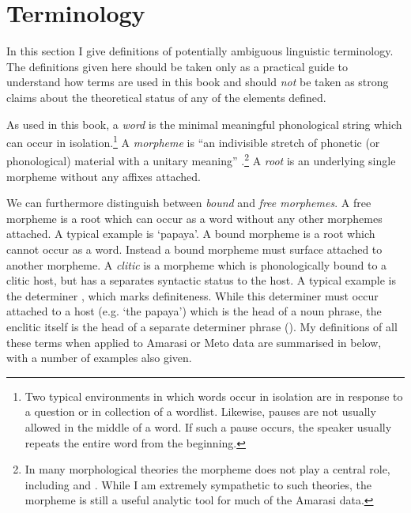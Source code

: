 \section{Terminology}\label{sec:Ter}
In this section I give definitions of potentially ambiguous linguistic terminology.
The definitions given here should be taken only as a practical guide
to understand how terms are used in this book
and should \emph{not} be taken as strong claims
about the theoretical status of any of the elements defined.

As used in this book, a \emph{word} is the minimal meaningful
phonological string which can occur in isolation.\footnote{
		Two typical environments in which words occur in isolation are
		in response to a question or in collection of a wordlist.
		Likewise, pauses are not usually allowed in the middle of a word.
		If such a pause occurs, the speaker usually repeats the entire word from the beginning.}
A \emph{morpheme} is ``an indivisible stretch of phonetic (or phonological)
material with a unitary meaning'' \citep[49]{an92}.\footnote{
		In many morphological theories the morpheme does not play a central role,
		including \cite{ma74,an92} and \cite{st01}.
		While I am extremely sympathetic to such theories,
		the morpheme is still a useful analytic tool for much of the Amarasi data.}
A \emph{root} is an underlying single morpheme without any affixes attached.

We can furthermore distinguish between \emph{bound} and \emph{free morphemes}.
A free morpheme is a root which can occur as a word without any other morphemes attached.
A typical example is  `papaya'.
A bound morpheme is a root which cannot occur as a word.
Instead a bound morpheme must surface attached to another morpheme.
A \emph{clitic} is a morpheme which is phonologically bound
to a clitic host, but has a separates syntactic status to the host.
A typical example is the determiner , which marks definiteness.
While this determiner must occur attached to a host (e.g.  `the papaya')
which is the head of a noun phrase, the enclitic itself 
is the head of a separate determiner phrase ().
My definitions of all these terms when applied to Amarasi or Meto data
are summarised in  below, with a number of examples also given.

